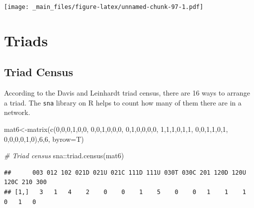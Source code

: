 \documentclass[
  notitlepage,
  onecolumn,
  openany]{book}
\newenvironment{Shaded}{\begin{snugshade}}{\end{snugshade}}
\newcommand{\AttributeTok}[1]{\textcolor[rgb]{0.77,0.63,0.00}{#1}}
\newcommand{\CommentTok}[1]{\textcolor[rgb]{0.56,0.35,0.01}{\textit{#1}}}
\newcommand{\DecValTok}[1]{\textcolor[rgb]{0.00,0.00,0.81}{#1}}
\newcommand{\FunctionTok}[1]{\textcolor[rgb]{0.00,0.00,0.00}{#1}}
\newcommand{\NormalTok}[1]{#1}
\newcommand{\OtherTok}[1]{\textcolor[rgb]{0.56,0.35,0.01}{#1}}
\newcommand{\SpecialCharTok}[1]{\textcolor[rgb]{0.00,0.00,0.00}{#1}}
\begin{document}
\texttt{[image: \_main\_files/figure-latex/unnamed-chunk-97-1.pdf]}

\hypertarget{triads}{%
\section{Triads}\label{triads}}

\hypertarget{triad-census}{%
\subsection{Triad Census}\label{triad-census}}

According to the Davis and Leinhardt triad census, there are 16 ways to arrange a triad. The \texttt{sna} library on R helps to count how many of them there are in a network.

\begin{Shaded}
\begin{Highlighting}[]
\NormalTok{mat6}\OtherTok{\textless{}{-}}\FunctionTok{matrix}\NormalTok{(}\FunctionTok{c}\NormalTok{(}\DecValTok{0}\NormalTok{,}\DecValTok{0}\NormalTok{,}\DecValTok{0}\NormalTok{,}\DecValTok{1}\NormalTok{,}\DecValTok{0}\NormalTok{,}\DecValTok{0}\NormalTok{,}
               \DecValTok{0}\NormalTok{,}\DecValTok{0}\NormalTok{,}\DecValTok{1}\NormalTok{,}\DecValTok{0}\NormalTok{,}\DecValTok{0}\NormalTok{,}\DecValTok{0}\NormalTok{,}
               \DecValTok{0}\NormalTok{,}\DecValTok{1}\NormalTok{,}\DecValTok{0}\NormalTok{,}\DecValTok{0}\NormalTok{,}\DecValTok{0}\NormalTok{,}\DecValTok{0}\NormalTok{,}
               \DecValTok{1}\NormalTok{,}\DecValTok{1}\NormalTok{,}\DecValTok{1}\NormalTok{,}\DecValTok{0}\NormalTok{,}\DecValTok{1}\NormalTok{,}\DecValTok{1}\NormalTok{,}
               \DecValTok{0}\NormalTok{,}\DecValTok{0}\NormalTok{,}\DecValTok{1}\NormalTok{,}\DecValTok{1}\NormalTok{,}\DecValTok{0}\NormalTok{,}\DecValTok{1}\NormalTok{,}
               \DecValTok{0}\NormalTok{,}\DecValTok{0}\NormalTok{,}\DecValTok{0}\NormalTok{,}\DecValTok{0}\NormalTok{,}\DecValTok{1}\NormalTok{,}\DecValTok{0}\NormalTok{),}\DecValTok{6}\NormalTok{,}\DecValTok{6}\NormalTok{, }\AttributeTok{byrow=}\NormalTok{T)}

\CommentTok{\# Triad census}
\NormalTok{sna}\SpecialCharTok{::}\FunctionTok{triad.census}\NormalTok{(mat6)}
\end{Highlighting}
\end{Shaded}

\begin{verbatim}
##      003 012 102 021D 021U 021C 111D 111U 030T 030C 201 120D 120U 120C 210 300
## [1,]   3   1   4    2    0    0    1    5    0    0   1    1    1    0   1   0
\end{verbatim}
\end{document}
